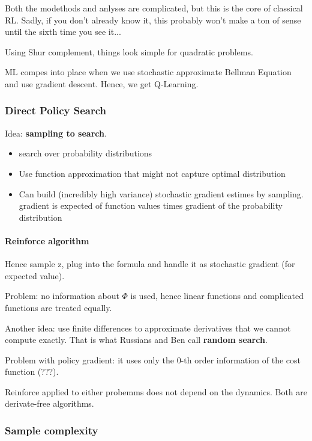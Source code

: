 \documentclass[11pt,oneside,a4paper]{scrartcl}
\begin{document}
Both the modethods and anlyses are complicated, but this is the core of
classical RL. Sadly, if you don't already know it, this probably won't
make a ton of sense until the sixth time you see it...

Using Shur complement, things look simple for quadratic problems.

ML compes into place when we use stochastic approximate Bellman Equation and use gradient
descent. Hence, we get Q-Learning.


\subsubsection{Direct Policy Search}

Idea: \textbf{sampling to search}. 

\begin{itemize}
\item search over probability distributions
  
\item Use function approximation that might not capture optimal distribution
\item Can build (incredibly high variance) stochastic gradient estimes
  by sampling. gradient is expected of function values times gradient
  of the probability distribution
\end{itemize}

\paragraph{Reinforce algorithm} Hence sample z, plug into the formula and handle it as stochastic
gradient (for expected value).

Problem: no information about $\Phi$ is used, hence linear functions and
complicated functions are treated equally.

Another idea: use finite differences to approximate derivatives that
we cannot compute exactly. That is what Russians and Ben call
\textbf{random search}.

Problem with policy gradient: it uses only the 0-th order information
of the cost function (???).

Reinforce applied to either probemms does not depend on the
dynamics. Both are derivate-free algorithms.

\subsubsection{Sample complexity}
\label{sec:sample-complexity}
\end{document}
